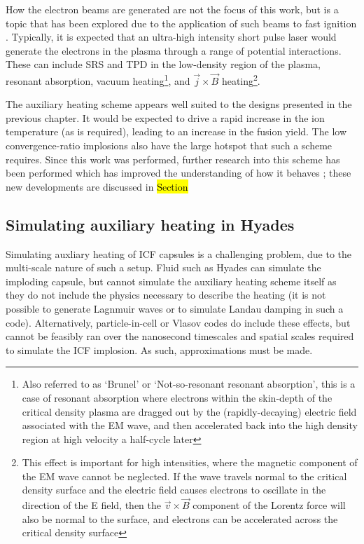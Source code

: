 How the electron beams are generated are not the focus of this work, but is a topic that has been explored  due to the application of such beams to fast ignition \cite{Tabak2005, Kemp2014}. Typically, it is expected that an ultra-high intensity short pulse laser would generate the electrons in the plasma through a range of potential interactions. These can include SRS and TPD in the low-density region of the plasma,  resonant absorption, vacuum heating\footnote{Also referred to as `Brunel' or `Not-so-resonant resonant absorption', this is a case of resonant absorption where electrons within the skin-depth of the critical density plasma are dragged out by the (rapidly-decaying) electric field associated with the EM wave, and then accelerated back into the high density region at high velocity a half-cycle later}, and $\vec{j} \times \vec{B}$ heating\footnote{This effect is important for high intensities, where the magnetic component of the EM wave cannot be neglected. If the wave travels normal to the critical density surface and the electric field causes electrons to oscillate in the direction of the E field, then the $\vec{v} \times \vec{B}$ component of the Lorentz force will also be normal to the surface, and electrons can be accelerated across the critical density surface}\cite{Wilks1997}.

The auxiliary heating scheme appears well suited to the designs presented in the previous chapter. It would be expected to drive a rapid increase in the ion temperature (as is required), leading to an increase in the fusion yield. The low convergence-ratio implosions also have the large hotspot that such a scheme requires. Since this work was performed, further research into this scheme has been performed which has improved the understanding of how it behaves \cite{Lee2023}; these new developments are discussed in \hl{Section}

\subsection{Simulating auxiliary heating in Hyades}

Simulating auxliary heating of ICF capsules is a challenging problem, due to the multi-scale nature of such a setup. Fluid such as Hyades can simulate the imploding capsule, but cannot simulate the auxiliary heating scheme itself as they do not include the physics necessary to describe the heating (it is not possible to generate Lagnmuir waves or to simulate Landau damping in such a code). Alternatively, particle-in-cell or Vlasov codes do include these effects, but cannot be feasibly ran over the nanosecond timescales and spatial scales required to simulate the ICF implosion. As such, approximations must be made.

